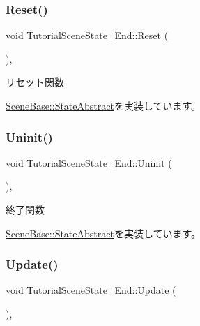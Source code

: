 \subsubsection{\texorpdfstring{Reset()}{Reset()}}
{\footnotesize\ttfamily void Tutorial\+Scene\+State\+\_\+\+End\+::\+Reset (\begin{DoxyParamCaption}{ }\end{DoxyParamCaption})\hspace{0.3cm}{\ttfamily [override]}, {\ttfamily [virtual]}}



リセット関数 



\mbox{\hyperlink{class_scene_base_1_1_state_abstract_a7e00d36fa023d91a0f205f12662584a0}{Scene\+Base\+::\+State\+Abstract}}を実装しています。

\mbox{\label{class_tutorial_scene_state___end_aafc0d8d042de8c7f79d84fcdc35a807c}} 
\subsubsection{\texorpdfstring{Uninit()}{Uninit()}}
{\footnotesize\ttfamily void Tutorial\+Scene\+State\+\_\+\+End\+::\+Uninit (\begin{DoxyParamCaption}{ }\end{DoxyParamCaption})\hspace{0.3cm}{\ttfamily [override]}, {\ttfamily [virtual]}}



終了関数 



\mbox{\hyperlink{class_scene_base_1_1_state_abstract_a7a92fbd3fd68177a4e807bf7c359641c}{Scene\+Base\+::\+State\+Abstract}}を実装しています。

\mbox{\label{class_tutorial_scene_state___end_a7cdf03fa9a0e41ab86c2b41b8165ad09}} 
\subsubsection{\texorpdfstring{Update()}{Update()}}
{\footnotesize\ttfamily void Tutorial\+Scene\+State\+\_\+\+End\+::\+Update (\begin{DoxyParamCaption}{ }\end{DoxyParamCaption})\hspace{0.3cm}{\ttfamily [override]}, {\ttfamily [virtual]}}



